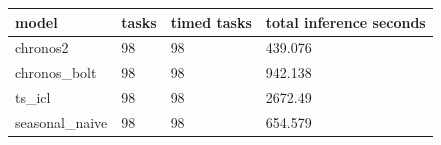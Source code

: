 \begin{tabular}{llll}
\toprule
model & tasks & timed tasks & total inference seconds \\
\midrule
chronos2 & 98 & 98 & 439.076 \\
chronos\_bolt & 98 & 98 & 942.138 \\
ts\_icl & 98 & 98 & 2672.49 \\
seasonal\_naive & 98 & 98 & 654.579 \\
\bottomrule
\end{tabular}
